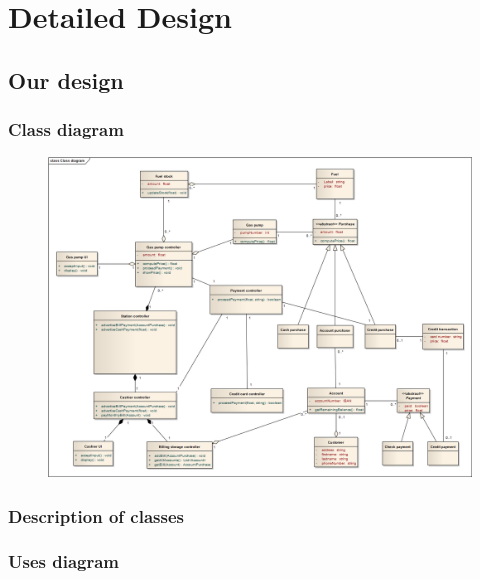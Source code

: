 \section{Detailed Design}
\subsection{Our design}
\subsubsection{Class diagram}

\begin{figure}[H]
 \centering
 \includegraphics[width=\textwidth]{../ClassDiagram.png}
\end{figure}

\subsubsection{Description of classes}


\subsubsection{Uses diagram}

